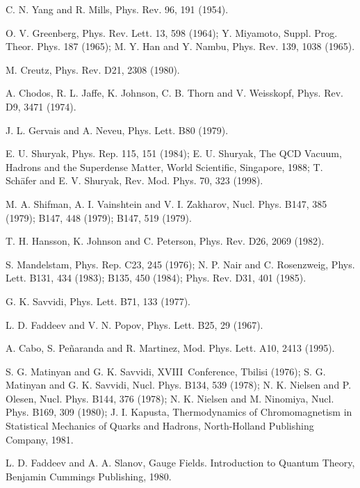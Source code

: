\documentclass[12pt,letterpaper]{report}
\begin{document}
\begin{thebibliography}{99}

 C. N. Yang and R. Mills, Phys. Rev. 96, 191 (1954).

 O. V. Greenberg, Phys. Rev. Lett. 13, 598 (1964);
Y. Miyamoto, Suppl. Prog. Theor. Phys. 187 (1965); M. Y. Han and
Y. Nambu, Phys. Rev. 139, 1038 (1965).

 M. Creutz, Phys. Rev. D21, 2308 (1980).

 A. Chodos, R. L. Jaffe, K. Johnson, C. B. Thorn and V.
Weisskopf, Phys. Rev. D9, 3471 (1974).

 J. L. Gervais and A. Neveu, Phys. Lett. B80 (1979).

 E. U. Shuryak, Phys. Rep. 115, 151 (1984); E. U. Shuryak,
The QCD Vacuum, Hadrons and the Superdense Matter, World
Scientific, Singapore, 1988; T. Sch\"{a}fer and E. V. Shuryak,
Rev. Mod. Phys. 70, 323 (1998).

 M. A. Shifman, A. I. Vainshtein and V. I. Zakharov,
Nucl. Phys. B147, 385 (1979); B147, 448 (1979); B147, 519 (1979).

 T. H. Hansson, K. Johnson and C. Peterson, Phys. Rev.
D26, 2069 (1982).

 S. Mandelstam, Phys. Rep. C23, 245 (1976); N. P. Nair
and C. Rosenzweig, Phys. Lett. B131, 434 (1983); B135, 450 (1984);
Phys. Rev. D31, 401 (1985).

 G. K. Savvidi, Phys. Lett. B71, 133 (1977).

 L. D. Faddeev and V. N. Popov, Phys. Lett.
B25, 29 (1967).

 A. Cabo, S. Pe\~{n}aranda and R. Martinez,
Mod. Phys. Lett. A10, 2413 (1995).

\newpage

 S. G. Matinyan and G. K. Savvidi, XVIII\ Conference,
Tbilisi (1976); S. G. Matinyan and G. K. Savvidi, Nucl. Phys.
B134, 539 (1978); N. K. Nielsen and P. Olesen, Nucl. Phys. B144,
376 (1978); N. K. Nielsen and M. Ninomiya, Nucl. Phys. B169, 309
(1980); J. I. Kapusta, Thermodynamics of Chromomagnetism in
Statistical Mechanics of Quarks and Hadrons, North-Holland
Publishing Company, 1981.

 L. D. Faddeev and A. A. Slanov, Gauge Fields.
Introduction to Quantum Theory, Benjamin Cummings Publishing, 1980.


\end{thebibliography}
\end{document}
